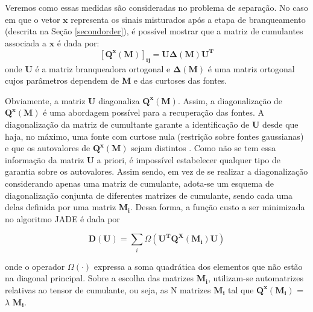     Veremos como essas medidas são consideradas no problema de separação. No caso em que o vetor $\mathbf{x}$ representa os sinais misturados após a etapa de branqueamento (descrita na Seção \ref{secondorder}), é possível mostrar \cite{ICA3} que a matriz de cumulantes associada a $\mathbf{x}$ é dada por:
    \begin{equation}
        \mathbf{[Q^x(M)]_{ij}} = \mathbf{U\Delta(M)U^T}
    \end{equation}
    onde $\mathbf{U}$ é a matriz branqueadora ortogonal e  $\mathbf{\Delta(M)}$ é uma matriz ortogonal cujos parâmetros dependem de $\mathbf{M}$ e das curtoses das fontes.

    Obviamente, a matriz $\mathbf{U}$ diagonaliza  $\mathbf{Q^x(M)}$. Assim, a diagonalização de $\mathbf{Q^x(M)}$ é uma abordagem possível para a recuperação das fontes.  A diagonalização da matriz de cumultante garante a identificação de $\mathbf{U}$ desde que haja, no máximo, uma fonte com curtose nula (restrição sobre fontes gaussianas) e que os autovalores de $\mathbf{Q^x(M)}$ sejam distintos \cite{JADE}. Como não se tem essa informação da matriz $\mathbf{U}$ a priori, é impossível estabelecer qualquer tipo de garantia sobre os autovalores.
    Assim sendo, em vez de se realizar a diagonalização considerando apenas uma matriz de cumulante, adota-se um esquema de diagonalização conjunta de diferentes matrizes de cumulante, sendo cada uma delas definida por uma matriz $\mathbf{M_i}$. Dessa forma, a função custo a ser minimizada no algoritmo JADE é dada por
    
    \begin{equation}\label{eq:optimize}
        \mathbf{D(U)} = \sum_i \Omega(\mathbf{U^TQ^X(M_i)U})
    \end{equation}
    
    onde o operador $\Omega(\cdot)$ expressa a soma quadrática dos elementos que não estão na diagonal principal. Sobre a escolha das matrizes $\mathbf{M_i}$, utilizam-se automatrizes relativas ao tensor de cumulante, ou seja, as N matrizes $\mathbf{M_i}$ tal que $\mathbf{Q^x(M_i)}$ = $\lambda$ $\mathbf{M_i}$.
    
